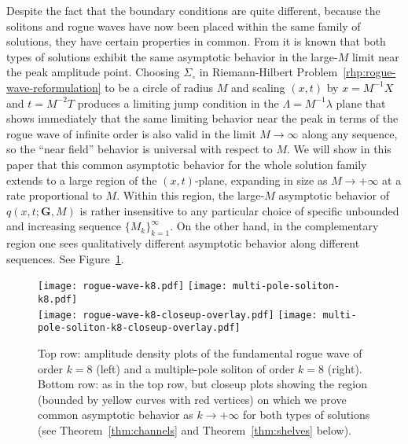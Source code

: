 Despite the fact that the boundary conditions are quite different, because the solitons and rogue waves have now been placed within the same family of solutions, they have certain properties in common.  From \cite{BilmanB19,BilmanLM20} it is known that both types of solutions exhibit the same asymptotic behavior in the large-$M$ limit near the peak amplitude point.  Choosing $\Sigma_\circ$ in Riemann-Hilbert Problem~\ref{rhp:rogue-wave-reformulation} to be a circle of radius $M$ and scaling $(x,t)$ by $x=M^{-1}X$ and $t=M^{-2}T$ produces a limiting jump condition in the $\Lambda=M^{-1}\lambda$ plane that shows immediately that the same limiting behavior near the peak in terms of the rogue wave of infinite order is also valid in the limit $M\to\infty$ along any sequence, so the ``near field'' behavior is universal with respect to $M$.  We will show in this paper that this common asymptotic behavior for the whole solution family extends to a large region of the $(x,t)$-plane, expanding in size as $M\to+\infty$ at a rate proportional to $M$.  Within this region,
the large-$M$ asymptotic behavior of $q(x,t;\mathbf{G},M)$ is rather insensitive to any particular choice of specific unbounded and increasing sequence $\{M_k\}_{k=1}^\infty$.  On the other hand, in the complementary region one sees qualitatively different asymptotic behavior along different sequences.  See Figure~\ref{fig:roguewaves-and-solitons}.

\begin{figure}[h]
\begin{center}
\phantom{!}\hfill\texttt{[image: rogue-wave-k8.pdf]}\hfill%
\texttt{[image: multi-pole-soliton-k8.pdf]}\hfill\phantom{!}\\
\phantom{!}\hfill\texttt{[image: rogue-wave-k8-closeup-overlay.pdf]}\hfill%
\texttt{[image: multi-pole-soliton-k8-closeup-overlay.pdf]}\hfill\phantom{!}
\end{center}
\caption{Top row:  amplitude density plots of the fundamental rogue wave of order $k=8$ (left) and a multiple-pole soliton of order $k=8$ (right).  Bottom row:  as in the top row, but closeup plots showing the region (bounded by yellow curves with red vertices) on which we prove common asymptotic behavior as $k\to+\infty$ for both types of solutions (see Theorem~\ref{thm:channels} and Theorem~\ref{thm:shelves} below).}
\label{fig:roguewaves-and-solitons}
\end{figure}

